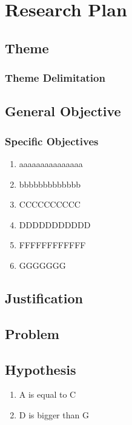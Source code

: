 \chapter{Research Plan} \label{chap:ResearchPlan}




\section{Theme} \label{sec::Theme}



\subsection{Theme Delimitation} \label{subsec::ThemeDelimitation}

\lipsum[2-3]

\section{General Objective} \label{sec:objective}


\subsection{Specific Objectives}
\begin{enumerate}
    \item aaaaaaaaaaaaaaa
    \item bbbbbbbbbbbbb
    \item CCCCCCCCCC
    \item DDDDDDDDDDD
    \item FFFFFFFFFFFF
    \item GGGGGGG
\end{enumerate}


\section{Justification}\label{sec:justification}



\section{Problem} \label{sec::Problem}



\section{Hypothesis} \label{sec::Hypothesis}
\begin{enumerate}
    \item A is equal to C
    \item D is bigger than G
\end{enumerate}


